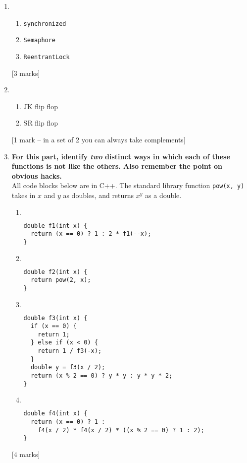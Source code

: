 \documentclass[12pt, a4paper]{article}
\begin{document}
\begin{enumerate}
\newpage

\item
\begin{enumerate}
\item \texttt{synchronized}
\item \texttt{Semaphore}
\item \texttt{ReentrantLock}
\end{enumerate}
[3 marks]

\item
\begin{enumerate}
\item JK flip flop
\item SR flip flop
\end{enumerate}
[1 mark -- in a set of 2 you can always take complements]

\item
\textbf{For this part, identify \textit{two} distinct ways in which each of these functions is not like the others. Also remember the point on obvious hacks.} \\[12pt] 
All code blocks below are in C++. The standard library function \texttt{pow(x, y)} takes in $x$ and $y$ as doubles, and returns $x^y$ as a double.
\begin{enumerate}
\item $\:$
\begin{lstlisting} 
double f1(int x) {
  return (x == 0) ? 1 : 2 * f1(--x);
}
\end{lstlisting}
\item $\:$
\begin{lstlisting} 
double f2(int x) {
  return pow(2, x);
}
\end{lstlisting}
\item $\:$
\begin{lstlisting} 
double f3(int x) {
  if (x == 0) {
    return 1;
  } else if (x < 0) {
    return 1 / f3(-x);
  }
  double y = f3(x / 2);
  return (x % 2 == 0) ? y * y : y * y * 2;
}
\end{lstlisting}
\item $\:$
\begin{lstlisting} 
double f4(int x) {
  return (x == 0) ? 1 :
    f4(x / 2) * f4(x / 2) * ((x % 2 == 0) ? 1 : 2);
}
\end{lstlisting}
\end{enumerate}
[4 marks]



\end{enumerate}
\end{document}
